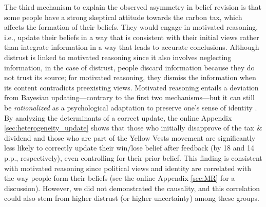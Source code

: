 \documentclass[12pt]{article} %
\begin{document}

The third mechanism to explain the observed asymmetry in belief revision is that some people have a strong skeptical attitude towards the carbon tax, which affects the formation of their beliefs. They would engage in motivated reasoning, i.e., update their beliefs in a way that is consistent with their initial views \citep{druckman_evidence_2019,little_distortion_2019} rather than integrate information in a way that leads to accurate conclusions. Although distrust is linked to motivated reasoning since it also involves neglecting information, in the case of distrust, people discard information because they do not trust its source; for motivated reasoning, they dismiss the information when its content contradicts preexisting views. Motivated reasoning entails a deviation from Bayesian updating---contrary to the first two mechanisms---but it can still be \textit{rationalized} as a psychological adaptation to preserve one's sense of identity \citep{kahan_ideology_2013}. By analyzing the determinants of a correct update, the online Appendix \ref{sec:heterogeneity_update} shows that those who initially disapprove of the tax \& dividend and those who are part of the Yellow Vests movement are significantly less likely to correctly update their win/lose belief after feedback (by 18 and 14 p.p., respectively), even controlling for their prior belief. This finding is consistent with motivated reasoning since political views and identity are correlated with the way people form their beliefs (see the online Appendix \ref{sec:MR} for a discussion). However, we did not demonstrated the causality, and this correlation could also stem from higher distrust (or higher uncertainty) among these groups.

\end{document}
